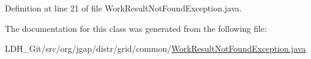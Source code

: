 Definition at line 21 of file Work\-Result\-Not\-Found\-Exception.\-java.



The documentation for this class was generated from the following file\-:\begin{DoxyCompactItemize}
\item 
L\-D\-H\-\_\-\-Git/src/org/jgap/distr/grid/common/\hyperlink{_work_result_not_found_exception_8java}{Work\-Result\-Not\-Found\-Exception.\-java}\end{DoxyCompactItemize}
